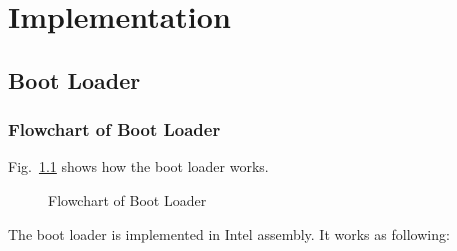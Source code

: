 \documentclass{swfcthesis}
\begin{document}
\chapter{Implementation}

\section{Boot Loader}

\subsection{Flowchart of Boot Loader}
\label{sec:flowch-boot-load}

Fig.~\ref{fig:flowchart-of-boot-loader} shows how the boot loader works.

\begin{figure}[!ht]
  \centering
  \caption{Flowchart of Boot Loader}
  \label{fig:flowchart-of-boot-loader}
\end{figure}

The boot loader is implemented in Intel assembly. It works as following:
\end{document}
